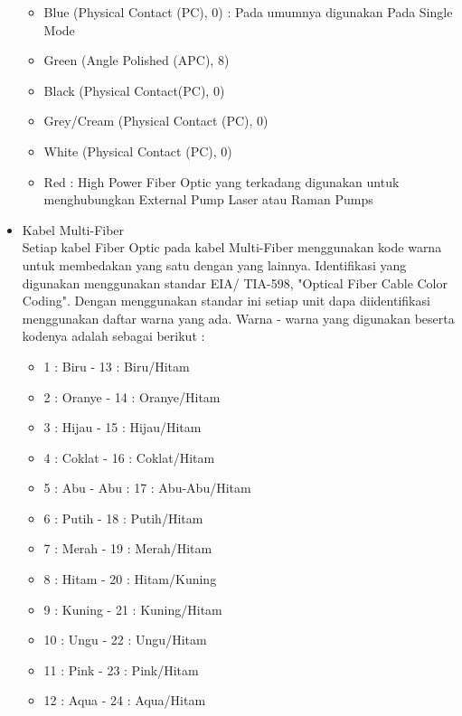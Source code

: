 \begin{flushleft}
\begin{itemize}
	\begin{itemize}
		\item Blue (Physical Contact (PC), 0) : Pada umumnya digunakan Pada Single Mode
		\item Green (Angle Polished (APC), 8)
		\item Black (Physical Contact(PC), 0)
		\item Grey/Cream (Physical Contact (PC), 0)
		\item White (Physical Contact (PC), 0)
		\item Red : High Power Fiber Optic yang terkadang digunakan untuk menghubungkan External Pump Laser atau Raman Pumps
	\end{itemize}
\item Kabel Multi-Fiber \\ Setiap kabel Fiber Optic pada kabel Multi-Fiber menggunakan kode warna untuk membedakan yang satu dengan yang lainnya. Identifikasi yang digunakan menggunakan standar EIA/ TIA-598, "Optical Fiber Cable Color Coding". Dengan menggunakan standar ini setiap unit dapa diidentifikasi menggunakan daftar warna yang ada. Warna - warna yang digunakan beserta kodenya adalah sebagai berikut : \\
\begin{itemize}
\item 1 : Biru - 13 : Biru/Hitam
\item 2 : Oranye - 14 : Oranye/Hitam 
\item 3 : Hijau - 15 : Hijau/Hitam 
\item 4 : Coklat - 16 : Coklat/Hitam 
\item 5 : Abu - Abu : 17 : Abu-Abu/Hitam 
\item 6 : Putih - 18 : Putih/Hitam 
\item 7 : Merah - 19 : Merah/Hitam 
\item 8 : Hitam - 20 : Hitam/Kuning 
\item 9 : Kuning - 21 : Kuning/Hitam 
\item 10 : Ungu - 22 : Ungu/Hitam 
\item 11 : Pink - 23 : Pink/Hitam 
\item 12 : Aqua - 24 : Aqua/Hitam 
\end{itemize}
\end{itemize}
\end{flushleft}
